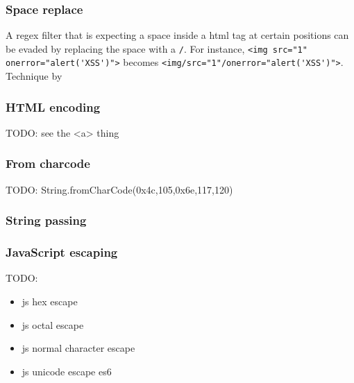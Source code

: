 \subsubsection{Space replace}
A regex filter that is expecting a space inside a html tag at certain positions can be evaded by replacing the space with a \verb|/|.
For instance, \verb|<img src="1" onerror="alert('XSS')">| becomes \verb|<img/src="1"/onerror="alert('XSS')">|.
Technique by \cite{medium/allypetitt}

\subsubsection{HTML encoding}
{\color{red}TODO: see the <a> thing}

\subsubsection{From charcode}
{\color{red}TODO: String.fromCharCode(0x4c,105,0x6e,117,120) \cite{asecsite/jsobf1}}

\subsubsection{String passing}
\subsubsection{JavaScript escaping}
\label{sec:jsescape}
{\color{red} TODO:
\begin{itemize}
\item js hex escape 
\item js octal escape
\item js normal character escape
\item js unicode escape es6
\end{itemize}
}

